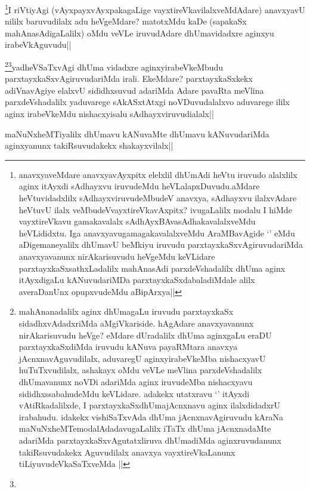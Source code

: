 \begin{artha}
\footnote{anavxyaveMdare anavxyavAyxpitx elelxlil dhUmAdi heVtu iruvudo alalxlilx aginx itAyxdi sAdhayxvu iruvudeMdu heVLalapxDuvudu.aMdare heVtuvidadxlilx sAdhayxviruvudeMbudeV anavxya, sAdhayxvu ilalxvAdare heVtuvU ilalx veMbudeVvayxtireVkavAxpitx? ivugaLalilx modalu I hiMde vayxtireVkavu gamakavalalx sAdhAyxBAvasAdhakavalalxveMdu heVLididxtu. Iga anavxyavugamagakavalalxveMdu AraMBavAgide `\stext' eMdu aDigemaneyalilx dhUmavU beMkiyu iruvudu parxtayxkaSxvAgiruvudariMda anavxyavanunx nirAkarisuvudu heVgeMdu keVLidare parxtayxkaSxsathxLadalilx mahAnasAdi parxdeVshadalilx dhUma aginx itAyxdigaLu kANuvudariMDa parxtayxkaSxdabaladiMdale alilx averaDanUnx opupxvudeMdu aBipArxya||}I riVtiyAgi (vAyxpayxvAyxpakagaLige vayxtireVkavilalxveMdAdare) anavxyavU nililx baruvudilalx adu heVgeMdare? matotxMdu kaDe (sapakaSx mahAnasAdigaLalilx) oMdu veVLe iruvudAdare dhUmavidadxre aginxyu irabeVkAguvudu||
\end{artha}

\begin{artha}
\footnote{mahAnanadalilx aginx dhUmagaLu iruvudu parxtayxkaSx sidadhxvAdadxriMda aMgiVkariside. hAgAdare anavxyavanunx nirAkarisuvudu heVge? eMdare dUradalilx dhUma aginxgaLu eraDU parxtayxkaSxdiMda iruvudu kANuva payaRMtara anavxya jAcnxnavAguvudilalx, aduvaregU aginxyirabeVkeMba nishacxyavU huTuTxvudilalx, ashakayx oMdu veVLe meVlina parxdeVshadalilx dhUmavanunx noVDi adariMda aginx iruvudeMba nishacxyavu sididhxssabahudeMdu keVLidare. adakekx utatxravu `\stext' itAyxdi vAtiRkadalilxde, I parxtayxkaSxdhUmajAcnxnavu aginx ilalxdidadxrU irabahudu. idakekx vishiSaTxvAda dhUma jAcnxnavAgiruvudu kAraNa maNuNxheMTemodalAdadavugaLalilx iTaTx dhUma jAcnxnadaMte adariMda parxtayxkaSxvAgutatxliruva dhUmadiMda aginxruvudanunx takiRsuvudakekx Aguvudilalx anavxya vayxtireVkaLanunx tiLiyuvudeVkaSaTxveMda ||}\footnote{}yadheVSaTxvAgi dhUma vidadxre aginxyirabeVkeMbudu parxtayxkaSxvAgiruvudariMda irali. EkeMdare? parxtayxkaSxkekx adiVnavAgiye elalxvU sididhxsuvud adariMda Adare pavaRta meVlina parxdeVshadalilx yaduvarege sAkASxtAtxgi noVDuvudalalxvo aduvarege ililx aginx irabeVkeMdu nishacxyisalu sAdhayxviruvudialalx||
\end{artha}

\begin{artha}
maNuNxheMTiyalilx dhUmavu kANuvaMte dhUmavu kANuvudariMda aginxyanunx takiRsuvudakekx  shakayxvilalx||
\end{artha}

